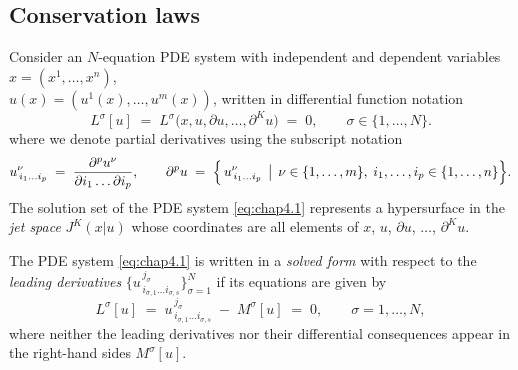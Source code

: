 \documentclass[alpha-refs, 12pt]{wiley-article}
\begin{document}
\subsection{Conservation laws}\label{ssec:CL}


Consider an $N$-equation PDE system with independent and dependent variables
$ x=(x^{1},\dots,x^{n})$,\\ $u(x)=(u^{1}(x),\dots,u^{m}(x))$,
written in differential function notation
\begin{equation}\label{eq:chap4.1}
  L^{\sigma}[u]\;=\;L^{\sigma}\bigl(x,u,\partial u,\dots,\partial^{K}u\bigr)\;=\;0,
  \qquad \sigma \in \{1,\dots,N\}.
\end{equation}
where we denote partial derivatives using the subscript notation
\[
u^{\nu}_{\,i_{1}\ldots i_{p}} \;=\; \dfrac{\partial^p u^{\nu}}{\partial i_{1}\ldots \partial i_{p}},\qquad
  \partial^{p}u\;=\;
  \Bigl\{\,
      u^{\nu}_{\,i_{1}\ldots i_{p}} \,\bigm|\,
      \nu \in \{1,\dots,m\},\;
      i_{1},\dots,i_{p} \in \{1,\dots,n\}
  \Bigr\}.
\]
The solution set of the PDE system \eqref{eq:chap4.1} represents a hypersurface in the \emph{jet space} $J^K(x|u)$ whose coordinates are all elements of $x$, $u$, $\partial u$, $\ldots$, $\partial^{K}u$.

The PDE system \eqref{eq:chap4.1} is written in a \emph{solved form} with respect to the \emph{leading derivatives} $\{u^{\,j_{\sigma}}_{\,i_{\sigma,1}\dots i_{\sigma,s}}\}_{\sigma=1}^{N}$ if its equations are given by
\begin{equation}\label{eq:chap4.5}
  L^{\sigma}[u]\;=\;
  u^{\,j_{\sigma}}_{\,i_{\sigma,1}\dots i_{\sigma,s}}
  \;-\;
  M^{\sigma}[u]
  \;=\;0,
  \qquad
  \sigma=1,\dots,N,
\end{equation}
where neither the leading derivatives nor their differential consequences appear in the right-hand sides $M^{\sigma}[u]$.
\end{document}
